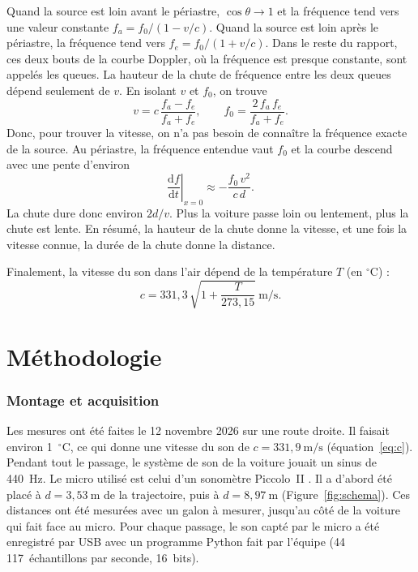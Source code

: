\documentclass[11pt,letterpaper]{article}
\newcommand{\beq}[1]{\begin{equation} \label{#1}}
\def\enq{\end{equation}}
\begin{document}
Quand la source est loin avant le périastre, $\cos\theta \to 1$ et la fréquence tend vers une valeur constante $f_a = f_0/(1 - v/c)$. Quand la source est loin après le périastre, la fréquence tend vers $f_e = f_0/(1 + v/c)$. Dans le reste du rapport, ces deux bouts de la courbe Doppler, où la fréquence est presque constante, sont appelés les queues. La hauteur de la chute de fréquence entre les deux queues dépend seulement de $v$. En isolant $v$ et $f_0$, on trouve
\beq{eq:plateaux}
    v = c\,\frac{f_a - f_e}{f_a + f_e} , \qquad f_0 = \frac{2\,f_a\,f_e}{f_a + f_e} .
\enq
Donc, pour trouver la vitesse, on n'a pas besoin de connaître la fréquence exacte de la source. Au périastre, la fréquence entendue vaut $f_0$ et la courbe descend avec une pente d'environ
\beq{eq:pente}
    \left.\frac{\mathrm{d}f}{\mathrm{d}t}\right|_{x=0} \approx -\frac{f_0\,v^2}{c\,d} .
\enq
La chute dure donc environ $2d/v$. Plus la voiture passe loin ou lentement, plus la chute est lente. En résumé, la hauteur de la chute donne la vitesse, et une fois la vitesse connue, la durée de la chute donne la distance.

Finalement, la vitesse du son dans l'air dépend de la température $T$ (en $^\circ$C) \cite{kinsler}:
\beq{eq:c}
    c = 331{,}3\,\sqrt{1 + \frac{T}{273{,}15}}~\text{m/s} .
\enq

\section{Méthodologie}
\label{sec:methodologie}

\subsubsection*{Montage et acquisition}
Les mesures ont été faites le 12 novembre 2026 sur une route droite. Il faisait environ 1~$^\circ$C, ce qui donne une vitesse du son de $c = 331{,}9~\text{m/s}$ (équation~\ref{eq:c}). Pendant tout le passage, le système de son de la voiture jouait un sinus de 440~Hz. Le micro utilisé est celui d'un sonomètre Piccolo~II \cite{protocole}. Il a d'abord été placé à $d = 3{,}53~\text{m}$ de la trajectoire, puis à $d = 8{,}97~\text{m}$ (Figure~\ref{fig:schema}). Ces distances ont été mesurées avec un galon à mesurer, jusqu'au côté de la voiture qui fait face au micro. Pour chaque passage, le son capté par le micro a été enregistré par USB avec un programme Python fait par l'équipe (44\,117~échantillons par seconde, 16~bits).
\end{document}
